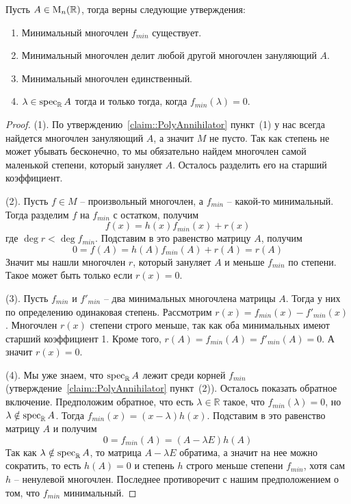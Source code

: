 \begin{claim}
\label{claim::MinPoly}
Пусть $A\in \operatorname{M}_{n}(\mathbb R)$, тогда верны следующие утверждения:
\begin{enumerate}
\item Минимальный многочлен $f_{min}$ существует.

\item Минимальный многочлен делит любой другой многочлен зануляющий $A$.

\item Минимальный многочлен единственный.

\item $\lambda\in\operatorname{spec}_\mathbb R A$ тогда и только тогда, когда $f_{min}(\lambda) = 0$.
\end{enumerate}
\end{claim}
\begin{proof}
(1).
По утверждению~\ref{claim::PolyAnnihilator} пункт~(1) у нас всегда найдется многочлен зануляющий $A$, а значит $M$ не пусто.
Так как степень не может убывать бесконечно, то мы обязательно найдем многочлен самой маленькой степени, который зануляет $A$.
Осталось разделить его на старший коэффициент.

(2).
Пусть $f\in M$ -- произвольный многочлен, а $f_{min}$ -- какой-то минимальный.
Тогда разделим $f$ на $f_{min}$ с остатком, получим 
\[
f(x) = h(x)f_{min}(x) + r(x)
\]
где $\deg r < \deg f_{min}$.
Подставим в это равенство матрицу $A$, получим
\[
0 = f(A) = h(A)f_{min}(A) + r(A) = r(A)
\]
Значит мы нашли многочлен $r$, который зануляет $A$ и меньше $f_{min}$ по степени.
Такое может быть только если $r(x) = 0$.

(3).
Пусть $f_{min}$ и $f'_{min}$ -- два минимальных многочлена матрицы $A$.
Тогда у них по определению одинаковая степень.
Рассмотрим $r(x) = f_{min}(x) - f'_{min}(x)$.
Многочлен $r(x)$ степени строго меньше, так как оба минимальных имеют старший коэффициент 1.
Кроме того, $r(A) = f_{min }(A) = f'_{min}(A) = 0$.
А значит $r(x) = 0$.

(4).
Мы уже знаем, что $\operatorname{spec}_\mathbb RA$ лежит среди корней $f_{min}$ (утверждение~\ref{claim::PolyAnnihilator} пункт~(2)).
Осталось показать обратное включение.
Предположим обратное, что есть $\lambda\in \mathbb R$ такое, что $f_{min}(\lambda) = 0$, но $\lambda\notin\operatorname{spec}_\mathbb RA$.
Тогда $f_{min}(x) = (x-\lambda)h(x)$.
Подставим в это равенство матрицу $A$ и получим 
\[
0 = f_{min}(A) = (A - \lambda E)h(A)
\]
Так как $\lambda\notin\operatorname{spec}_\mathbb R A$, то матрица $A-\lambda E$ обратима, а значит на нее можно сократить, то есть $h(A) = 0$ и степень $h$ строго меньше степени $f_{min}$, хотя сам $h$ -- ненулевой многочлен.
Последнее противоречит с нашим предположением о том, что $f_{min}$ минимальный.
\end{proof}

